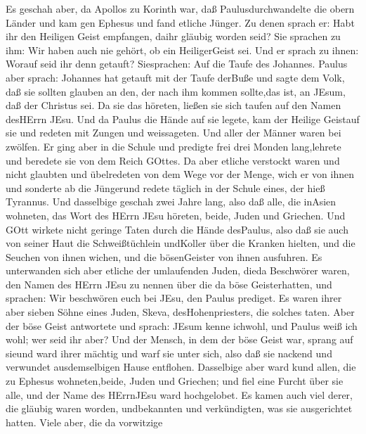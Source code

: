  Es geschah aber, da Apollos zu Korinth war, daß
Paulusdurchwandelte die obern Länder und kam gen Ephesus und fand
etliche Jünger.  Zu denen sprach er: Habt ihr den Heiligen
Geist empfangen, daihr gläubig worden seid? Sie sprachen zu ihm: Wir
haben auch nie gehört, ob ein HeiligerGeist sei.  Und er
sprach zu ihnen: Worauf seid ihr denn getauft? Siesprachen: Auf die
Taufe des Johannes.  Paulus aber sprach: Johannes hat
getauft mit der Taufe derBuße und sagte dem Volk, daß sie sollten
glauben an den, der nach ihm kommen sollte,das ist, an JEsum, daß der
Christus sei.  Da sie das höreten, ließen sie sich taufen
auf den Namen desHErrn JEsu.  Und da Paulus die Hände auf
sie legete, kam der Heilige Geistauf sie und redeten mit Zungen und
weissageten.  Und aller der Männer waren bei zwölfen.
 Er ging aber in die Schule und predigte frei drei Monden
lang,lehrete und beredete sie von dem Reich GOttes.  Da aber
etliche verstockt waren und nicht glaubten und übelredeten von dem Wege
vor der Menge, wich er von ihnen und sonderte ab die Jüngerund redete
täglich in der Schule eines, der hieß Tyrannus.  Und
dasselbige geschah zwei Jahre lang, also daß alle, die inAsien wohneten,
das Wort des HErrn JEsu höreten, beide, Juden und Griechen.
 Und GOtt wirkete nicht geringe Taten durch die Hände
desPaulus,  also daß sie auch von seiner Haut die
Schweißtüchlein undKoller über die Kranken hielten, und die Seuchen von
ihnen wichen, und die bösenGeister von ihnen ausfuhren.  Es
unterwanden sich aber etliche der umlaufenden Juden, dieda Beschwörer
waren, den Namen des HErrn JEsu zu nennen über die da böse
Geisterhatten, und sprachen: Wir beschwören euch bei JEsu, den Paulus
prediget.  Es waren ihrer aber sieben Söhne eines Juden,
Skeva, desHohenpriesters, die solches taten.  Aber der böse
Geist antwortete und sprach: JEsum kenne ichwohl, und Paulus weiß ich
wohl; wer seid ihr aber?  Und der Mensch, in dem der böse
Geist war, sprang auf sieund ward ihrer mächtig und warf sie unter sich,
also daß sie nackend und verwundet ausdemselbigen Hause entflohen.
 Dasselbige aber ward kund allen, die zu Ephesus
wohneten,beide, Juden und Griechen; und fiel eine Furcht über sie alle,
und der Name des HErrnJEsu ward hochgelobet.  Es kamen auch
viel derer, die gläubig waren worden, undbekannten und verkündigten, was
sie ausgerichtet hatten.  Viele aber, die da vorwitzige
